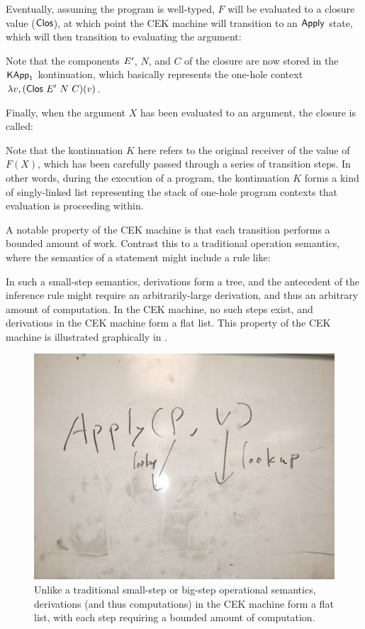 Eventually, assuming the program is well-typed, $F$ will be evaluated
to a closure value ($\Clos$), at which point the CEK machine will
transition to an $\Apply$ state, which will then transition to
evaluating the argument:
\begin{mathpar}
\end{mathpar}
Note that the components $\Env'$, $N$, and $C$ of the closure are now
stored in the $\KApp_1$ kontinuation, which basically represents
the one-hole context $\lambda v, (\Clos~\Env'~N~C)(v)$.

Finally, when the argument $X$ has been evaluated to an argument,
  the closure is called:
\begin{mathpar}
\end{mathpar}
Note that the kontinuation $K$ here refers to the original receiver
  of the value of $F(X)$, which has been carefully passed
  through a series of transition steps.
In other words, during the execution of a program,
  the kontinuation $K$ forms a kind of singly-linked list
  representing the stack of one-hole program contexts
  that evaluation is proceeding within.

A notable property of the CEK machine is that each transition performs
a bounded amount of work. Contrast this to a traditional operation
semantics, where the semantics of a \sCase statement might include a
rule like:

\begin{mathpar}
\end{mathpar}

In such a small-step semantics, derivations form a tree,
  and the antecedent of the inference rule might require
  an arbitrarily-large derivation,
  and thus an arbitrary amount of computation.
In the CEK machine, no such steps exist,
  and derivations in the CEK machine form a flat list.
This property of the CEK machine
  is illustrated graphically in .

\begin{figure}
\includegraphics[width=0.5\columnwidth]{img1}
\caption{
  Unlike a traditional small-step or big-step operational semantics,
  derivations (and thus computations) in the CEK machine
  form a flat list, with each step
  requiring a bounded amount of computation.
}
\label{fig:constant}
\end{figure}

